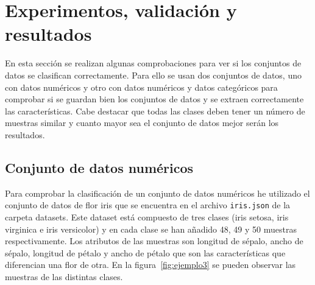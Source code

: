 \documentclass[a4paper, 12pt]{book}
\begin{document}

\cleardoublepage
\chapter{Experimentos, validación y resultados}

En esta sección se realizan algunas comprobaciones para ver si los conjuntos de datos se clasifican correctamente.
Para ello se usan dos conjuntos de datos, uno con datos numéricos y otro con datos numéricos y datos categóricos para comprobar si se guardan bien los conjuntos de datos y se extraen correctamente las características. 
Cabe destacar que todas las clases deben tener un número de muestras similar y cuanto mayor sea el conjunto de datos mejor serán los resultados.

\section{Conjunto de datos numéricos}
\label{subsec:numericos}

Para comprobar la clasificación de un conjunto de datos numéricos he utilizado el conjunto de datos de flor iris que se encuentra en el archivo \texttt{iris.json} de la carpeta datasets. Este dataset está compuesto de tres clases (iris setosa, iris virginica e iris versicolor) y en cada clase se han añadido 48, 49 y 50 muestras respectivamente. 
Los atributos de las muestras son longitud de sépalo, ancho de sépalo, longitud de pétalo y ancho de pétalo que son las características que diferencian una flor de otra. 
En la figura~\ref{fig:ejemplo3} se pueden observar las muestras de las distintas clases.
\end{document}
